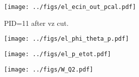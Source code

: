 \documentclass[12pt]{article}
\begin{document}
\begin{figure}[h!]
  \begin{center}
    \texttt{[image: ../figs/el\_ecin\_out\_pcal.pdf]}
     \caption{PID=11 after vz cut.}
    \label{fig:bonus12}
  \end{center}
\end{figure}




\begin{figure}[h!]
  \begin{center}
    \texttt{[image: ../figs/el\_phi\_theta\_p.pdf]}
     \caption{ }
    \label{fig:bonus12}
  \end{center}
\end{figure}


\begin{figure}[h!]
  \begin{center}
    \texttt{[image: ../figs/el\_p\_etot.pdf]}
     \caption{ }
    \label{fig:bonus12}
  \end{center}
\end{figure}


\begin{figure}[h!]
  \begin{center}
    \texttt{[image: ../figs/W\_Q2.pdf]}
     \caption{ }
    \label{fig:bonus12}
  \end{center}
\end{figure}
\end{document}
